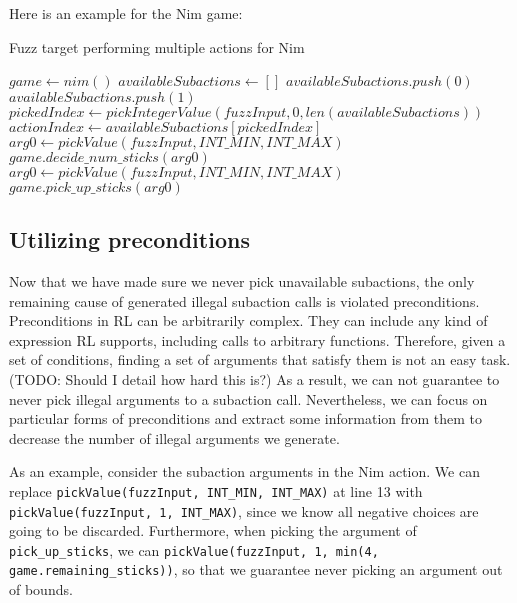 Here is an example for the Nim game:
\begin{algorithm}[H]
    \caption{Fuzz target performing multiple actions for Nim}
    \begin{algorithmic}[1]
    \STATE $game \gets nim()$
        \STATE $availableSubactions \gets []$
            \STATE $availableSubactions.push(0)$
        \ENDIF
            \STATE $availableSubactions.push(1)$
        \ENDIF
        \STATE $pickedIndex \gets pickIntegerValue(fuzzInput, 0, len(availableSubactions))$
        \STATE $actionIndex \gets availableSubactions[pickedIndex]$
            \STATE $arg0 \gets pickValue(fuzzInput, INT\_MIN, INT\_MAX)$
                \STATE $game.decide\_num\_sticks(arg0)$
            \ENDIF
        \ENDIF
            \STATE $arg0 \gets pickValue(fuzzInput, INT\_MIN, INT\_MAX)$
                \STATE $game.pick\_up\_sticks(arg0)$
            \ENDIF
        \ENDIF
    \ENDWHILE
    \end{algorithmic}
\end{algorithm}

\subsection{Utilizing preconditions}
Now that we have made sure we never pick unavailable subactions, the only remaining cause of generated illegal subaction calls is violated preconditions.
Preconditions in RL can be arbitrarily complex. They can include any kind of expression RL supports, including calls to arbitrary functions.
Therefore, given a set of conditions, finding a set of arguments that satisfy them is not an easy task. (TODO: Should I detail how hard this is?)
As a result, we can not guarantee to never pick illegal arguments to a subaction call.
Nevertheless, we can focus on particular forms of preconditions and extract some information from them to decrease the number of illegal arguments we generate.

As an example, consider the subaction arguments in the Nim action.
We can replace \texttt{pickValue(fuzzInput, INT\_MIN, INT\_MAX)} at line 13 with \texttt{pickValue(fuzzInput, 1, INT\_MAX)}, since we know all negative choices are going to be discarded.
Furthermore, when picking the argument of \texttt{pick\_up\_sticks}, we can \texttt{pickValue(fuzzInput, 1, min(4, game.remaining\_sticks))}, so that we guarantee never picking an argument out of bounds.

